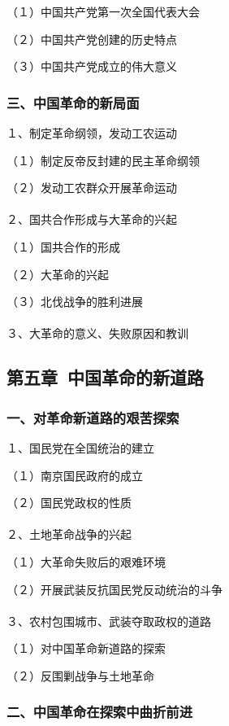 \documentclass{ctexart}
\begin{document}
（１）中国共产党第一次全国代表大会

（２）中国共产党创建的历史特点

（３）中国共产党成立的伟大意义

\subsubsection{三、中国革命的新局面}

１、制定革命纲领，发动工农运动

（１）制定反帝反封建的民主革命纲领

（２）发动工农群众开展革命运动
\\\\

２、国共合作形成与大革命的兴起

（１）国共合作的形成

（２）大革命的兴起

（３）北伐战争的胜利进展
\\\\

３、大革命的意义、失败原因和教训

\subsection{第五章\ 中国革命的新道路}

\subsubsection{一、对革命新道路的艰苦探索}

１、国民党在全国统治的建立

（１）南京国民政府的成立

（２）国民党政权的性质
\\\\

２、土地革命战争的兴起

（１）大革命失败后的艰难环境

（２）开展武装反抗国民党反动统治的斗争
\\\\

３、农村包围城市、武装夺取政权的道路

（１）对中国革命新道路的探索

（２）反围剿战争与土地革命

\subsubsection{二、中国革命在探索中曲折前进}
\end{document}
